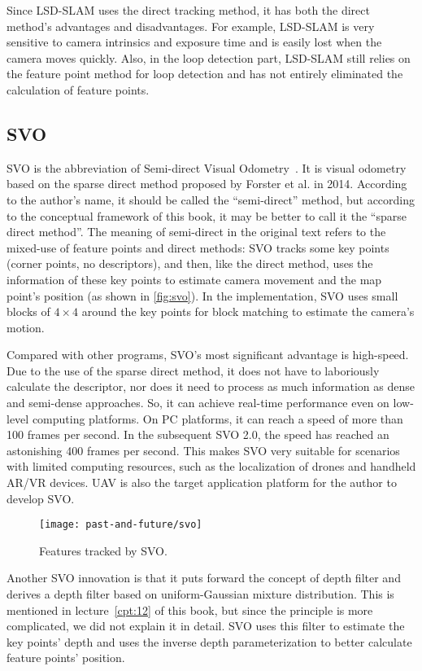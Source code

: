 Since LSD-SLAM uses the direct tracking method, it has both the direct method's advantages and disadvantages. For example, LSD-SLAM is very sensitive to camera intrinsics and exposure time and is easily lost when the camera moves quickly. Also, in the loop detection part, LSD-SLAM still relies on the feature point method for loop detection and has not entirely eliminated the calculation of feature points.

\subsection{SVO}
SVO is the abbreviation of Semi-direct Visual Odometry~\cite{Forster2014}. It is visual odometry based on the sparse direct method proposed by Forster et al. in 2014. According to the author's name, it should be called the ``semi-direct'' method, but according to the conceptual framework of this book, it may be better to call it the ``sparse direct method''. The meaning of semi-direct in the original text refers to the mixed-use of feature points and direct methods: SVO tracks some key points (corner points, no descriptors), and then, like the direct method, uses the information of these key points to estimate camera movement and the map point's position (as shown in \autoref{fig:svo}). In the implementation, SVO uses small blocks of $4\times4$ around the key points for block matching to estimate the camera's motion.

Compared with other programs, SVO's most significant advantage is high-speed. Due to the use of the sparse direct method, it does not have to laboriously calculate the descriptor, nor does it need to process as much information as dense and semi-dense approaches. So, it can achieve real-time performance even on low-level computing platforms. On PC platforms, it can reach a speed of more than 100 frames per second. In the subsequent SVO 2.0, the speed has reached an astonishing 400 frames per second. This makes SVO very suitable for scenarios with limited computing resources, such as the localization of drones and handheld AR/VR devices. UAV is also the target application platform for the author to develop SVO.

\begin{figure}[!htp]
	\centering
	\texttt{[image: past-and-future/svo]}
	\caption{Features tracked by SVO.}
	\label{fig:svo}
\end{figure}

Another SVO innovation is that it puts forward the concept of depth filter and derives a depth filter based on uniform-Gaussian mixture distribution. This is mentioned in lecture~\ref{cpt:12} of this book, but since the principle is more complicated, we did not explain it in detail. SVO uses this filter to estimate the key points' depth and uses the inverse depth parameterization to better calculate feature points' position.

